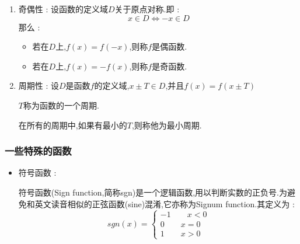 {{{{\begin{enumerate}
{              若对于任意的$x_1,x_2 \in D,x_1 < x_2 \Leftrightarrow \defFunction{x_1} \leq \defFunction{x_2}$,则称函数$f$在$D$单调增加.如果$\leq$可以换成$<$,则称为严格单调增加.

              记为 : $$
                  f\uparrow(f\mbox{严格}\uparrow)
              $$

              类似的,将不等号的箭头方向改变,也有单调减少和严格单调减少,记为 : $$
                  f\downarrow(f\mbox{严格}\downarrow)
              $$
              }
        \item {
              奇偶性 : 设函数的定义域$D$关于原点对称.即 : $$
                  x \in D \Leftrightarrow -x \in D
              $$
              那么 :

              \begin{itemize}
                  \item 若在$D$上,$f(x) = f(-x)$,则称$f$是偶函数.
                  \item 若在$D$上,$f(x) = -f(x)$,则称$f$是奇函数.
              \end{itemize}
              }
        \item {
              周期性 : 设$D$是函数$f$的定义域,$x \pm T \in D$,并且$f(x) = f(x \pm T)$

              $T$称为函数的一个周期.

              在所有的周期中,如果有最小的$T$,则称他为最小周期.

              }
    \end{enumerate}
}%

\subsubsection{一些特殊的函数}{
    \begin{itemize}
        \item {
              符号函数 :

              符号函数(Sign function,简称sgn)是一个逻辑函数,用以判断实数的正负号.为避免和英文读音相似的正弦函数(sine)混淆,它亦称为Signum function.其定义为 : $$
                  sgn(x) = \begin{cases}
                      -1\qquad x < 0 \\
                      0\qquad x = 0  \\
                      1\qquad x > 0
                  \end{cases}
              $$


}
\end{itemize}}}}}

